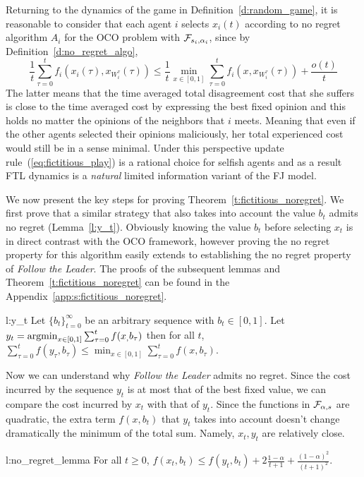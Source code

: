Returning to the dynamics of the game in Definition~\ref{d:random_game},
it is reasonable to consider that each agent $i$ selects $x_i(t)$ according
to no regret algorithm $A_i$ for the OCO problem with $\mathcal{F}_{s_i,\alpha_i}$,
since by Definition~\ref{d:no_regret_algo},
\[\frac{1}{t}\sum_{\tau=0}^t f_i(x_i(\tau),x_{W_i^\tau}(\tau)) \leq
\frac{1}{t}\min_{x \in [0,1]}\sum_{\tau=0}^tf_i(x,x_{W_i^\tau}(\tau)) + \frac{o(t)}{t}\]
The latter means that the time averaged total disagreement cost
that she suffers is close to the time averaged cost by expressing the
best fixed opinion and this holds no matter the opinions of the
neighbors that $i$ meets. Meaning that even if the other agents
selected their opinions maliciously, her total experienced cost
would still be in a sense minimal. Under this perspective
update rule~(\ref{eq:fictitious_play}) is a rational choice for
selfish agents and as a result FTL dynamics is 
a \emph{natural} limited information variant of the FJ model.



We now present the key steps for proving Theorem~\ref{t:fictitious_noregret}.
We first prove that a similar strategy that also takes into
account the value $b_t$ admits no regret (Lemma~\ref{l:y_t}).
Obviously knowing the value $b_t$ before selecting $x_t$
is in direct contrast with the OCO framework, however proving
the no regret property for this algorithm easily extends to
establishing the no regret property of \emph{Follow the Leader}.
The proofs of the subsequent lemmas and Theorem~\ref{t:fictitious_noregret} can
be found in the Appendix~\ref{app:s:fictitious_noregret}.
\begin{replemma}{l:y_t}
Let $\{b_t\}_{t=0}^\infty$ be an arbitrary sequence with $b_t \in [0,1]$.
Let $y_t = \operatorname*{argmin}_{x \in [0,1]}\sum_{\tau=0}^tf(x_,b_\tau)$
then for all $t$,
\(
\sum_{\tau=0}^t f(y_\tau,b_\tau) \leq \min_{x \in [0,1]}
\sum_{\tau = 0}^tf(x,b_\tau).
\)
\end{replemma}
Now we can understand why \emph{Follow the Leader}
admits no regret. Since the cost incurred by the sequence $y_t$ is at most that
of the best fixed value, we can compare the cost incurred by $x_t$ with
that of $y_t$.  Since the functions in $\mathcal{F}_{\alpha,s}$ are quadratic,
the extra term $f(x,b_t)$ that $y_t$ takes into account doesn't change
dramatically the minimum of the total sum. Namely, $x_t,y_t$
are relatively close.
\begin{replemma}{l:no_regret_lemma}
  For all $t\geq 0$,
  \(
    f(x_t,b_t) \leq f(y_t,b_t) + 2\frac{1-\alpha}{t+1} +
    \frac{(1-\alpha)^2}{(t+1)^2}
  \).
\end{replemma}

